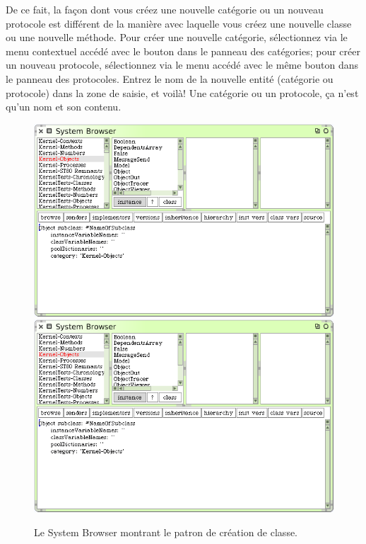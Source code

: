\documentclass[a4paper,10pt,twoside]{book}
\begin{document}
De ce fait, la fa\c{c}on dont vous cr\'eez une nouvelle cat\'egorie ou
un nouveau protocole est diff\'erent de la mani\`ere avec laquelle
vous cr\'eez une nouvelle classe ou une nouvelle m\'ethode. 
Pour cr\'eer une nouvelle cat\'egorie, s\'electionnez 
  via le menu contextuel acc\'ed\'e avec le bouton 
 dans le panneau des cat\'egories; pour cr\'eer un nouveau protocole, 
s\'electionnez  via le menu acc\'ed\'e avec
le m\^eme bouton dans le panneau des protocoles.
Entrez le nom de la nouvelle entit\'e (cat\'egorie ou protocole) dans
la zone de saisie, et voil\`a! 
Une cat\'egorie ou un protocole, \c{c}a n'est qu'un nom et son contenu.

\begin{figure}[htbp]
   \centering
   \ifluluelse
	   {\includegraphics[width=\textwidth]{SystemBrowserClassCreation}}
	   {\includegraphics[scale=.7]{SystemBrowserClassCreation}}
   \caption{Le System Browser montrant le patron de cr\'eation de classe.
   \label{fig:SystemBrowserClassCreation}}
\end{figure}
\end{document}
